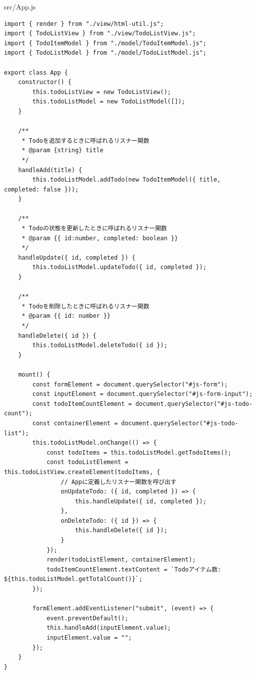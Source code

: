 \begin{listtitle}
src/App.js
\end{listtitle}
\begin{lstlisting}
import { render } from "./view/html-util.js";
import { TodoListView } from "./view/TodoListView.js";
import { TodoItemModel } from "./model/TodoItemModel.js";
import { TodoListModel } from "./model/TodoListModel.js";

export class App {
    constructor() {
        this.todoListView = new TodoListView();
        this.todoListModel = new TodoListModel([]);
    }

    /**
     * Todoを追加するときに呼ばれるリスナー関数
     * @param {string} title
     */
    handleAdd(title) {
        this.todoListModel.addTodo(new TodoItemModel({ title, completed: false }));
    }

    /**
     * Todoの状態を更新したときに呼ばれるリスナー関数
     * @param {{ id:number, completed: boolean }}
     */
    handleUpdate({ id, completed }) {
        this.todoListModel.updateTodo({ id, completed });
    }

    /**
     * Todoを削除したときに呼ばれるリスナー関数
     * @param {{ id: number }}
     */
    handleDelete({ id }) {
        this.todoListModel.deleteTodo({ id });
    }

    mount() {
        const formElement = document.querySelector("#js-form");
        const inputElement = document.querySelector("#js-form-input");
        const todoItemCountElement = document.querySelector("#js-todo-count");
        const containerElement = document.querySelector("#js-todo-list");
        this.todoListModel.onChange(() => {
            const todoItems = this.todoListModel.getTodoItems();
            const todoListElement = this.todoListView.createElement(todoItems, {
                // Appに定義したリスナー関数を呼び出す
                onUpdateTodo: ({ id, completed }) => {
                    this.handleUpdate({ id, completed });
                },
                onDeleteTodo: ({ id }) => {
                    this.handleDelete({ id });
                }
            });
            render(todoListElement, containerElement);
            todoItemCountElement.textContent = `Todoアイテム数: ${this.todoListModel.getTotalCount()}`;
        });

        formElement.addEventListener("submit", (event) => {
            event.preventDefault();
            this.handleAdd(inputElement.value);
            inputElement.value = "";
        });
    }
}
\end{lstlisting}
\listend


